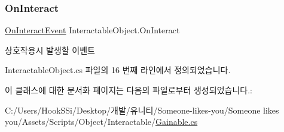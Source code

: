 \subsubsection{\texorpdfstring{OnInteract}{OnInteract}}
{\footnotesize\ttfamily \mbox{\hyperlink{class_interactable_object_a70a579e4b09d53e6cb77b5222189d5eb}{On\+Interact\+Event}} Interactable\+Object.\+On\+Interact\hspace{0.3cm}{\ttfamily [inherited]}}



상호작용시 발생할 이벤트 



Interactable\+Object.\+cs 파일의 16 번째 라인에서 정의되었습니다.



이 클래스에 대한 문서화 페이지는 다음의 파일로부터 생성되었습니다.\+:\begin{DoxyCompactItemize}
\item 
C\+:/\+Users/\+Hook\+S\+Si/\+Desktop/개발/유니티/\+Someone-\/likes-\/you/\+Someone likes you/\+Assets/\+Scripts/\+Object/\+Interactable/\mbox{\hyperlink{_gainable_8cs}{Gainable.\+cs}}\end{DoxyCompactItemize}
